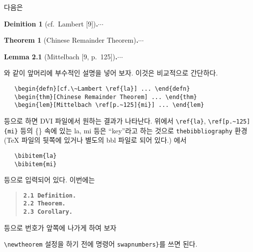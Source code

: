\documentclass[a4paper,10pt]{amsproc}
\newcommand\env[1]{\texttt{#1}}
\begin{document}
다음은

\textbf{Deinition 1} (cf.~Lambert [9])\textbf{.}\;\;$\cdots$

\textbf{Theorem 1} (Chinese Remainder Theorem)\textbf{.}\;\;$\cdots$

\textbf{Lemma 2.1} (Mittelbach [9, p.~125])\textbf{.}\;\;$\cdots$

\noindent 와 같이 앞머리에 부수적인 설명을 넣어 보자. 이것은 비교적으로
간단하다.
% 
% 
\begin{verbatim}
   \begin{defn}[cf.\~Lambert \ref{la}] ... \end{defn}
   \begin{thm}[Chinese Remainder Theorem] ... \end{thm}
   \begin{lem}[Mittelbach \ref[p.~125]{mi}] ... \end{lem}
\end{verbatim}
등으로 하면 DVI 파일에서 원하는 결과가 나타난다. 위에서
\verb|\ref{la}|, \verb|\ref[p.~125]{mi}|
등의 \{\;\} 속에
있는 la, mi 등은 ``key''라고 하는 것으로 \env{thebibbliography}
환경(\TeX{} 파일의 뒷쪽에 있거나 별도의 bbl 파일로 되어 있다.) 에서
\begin{verbatim}
   \bibitem{la}
   \bibitem{mi}
\end{verbatim}
등으로 입력되어 있다. 이번에는
\begin{quote}
     {\tt\bf 2.1 Definition.}\\
     {\tt\bf 2.2 Theorem.}\\
     {\tt\bf 2.3 Corollary.}
\end{quote}
등으로 번호가 앞쪽에 나가게 하여 보자

\verb|\newtheorem|
설정을 하기 전에 명령어
\verb|swapnumbers}|를 쓰면 된다.
\end{document}
